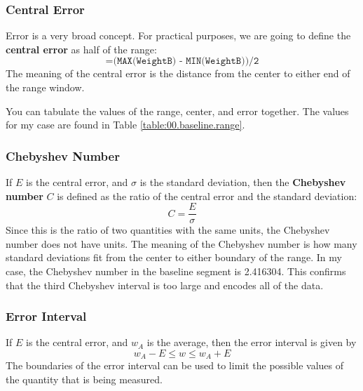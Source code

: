 \subsubsection{Central Error}
Error is a very broad concept. For practical purposes, we are going to define the \textbf{central error} as half of the range:
\begin{equation}
    \texttt{=(MAX(WeightB) - MIN(WeightB))/2}
    \label{eq:00.error}
\end{equation}
The meaning of the central error is the distance from the center to either end of the range window.

You can tabulate the values of the range, center, and error together. The values for my case are found in Table \ref{table:00.baseline.range}.
\subsubsection{Chebyshev Number}
If $E$ is the central error, and $\sigma$ is the standard deviation, then the \textbf{Chebyshev number} $C$ is defined as the ratio of the central error and the standard deviation:
\begin{equation}
    C = \frac{E}{\sigma}
\end{equation}
Since this is the ratio of two quantities with the same units, the Chebyshev number does not have units. The meaning of the Chebyshev number is how many standard deviations fit from the center to either boundary of the range. In my case, the Chebyshev number in the baseline segment is 2.416304. This confirms that the third Chebyshev interval is too large and encodes all of the data.
\subsubsection{Error Interval}
If $E$ is the central error, and $w_{A}$ is the average, then the error interval is given by
\begin{equation}
    w_{A} - E \leq w \leq w_{A} + E
\end{equation}
The boundaries of the error interval can be used to limit the possible values of the quantity that is being measured.

